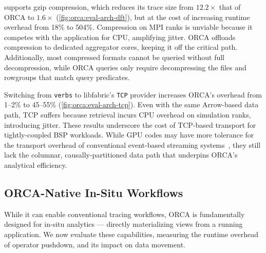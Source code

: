 \dftracer{} supports gzip compression, which reduces its trace size from $12.2\times$ that of ORCA
to $1.6\times$ (\cref{fig:orca:eval-arch-dft}), but at the cost of increasing runtime overhead from
18\% to 504\%.
Compression on MPI ranks is unviable because it competes with the application for CPU, amplifying
jitter.
ORCA offloads compression to dedicated aggregator cores, keeping it off the critical path.
Additionally, most compressed formats cannot be queried without full decompression, while ORCA
queries only require decompressing the files and rowgroups that match query predicates.

Switching from \texttt{verbs} to libfabric's \texttt{TCP} provider increases ORCA's overhead from
1--2\% to 45--55\% (\cref{fig:orca:eval-arch-tcp}).
Even with the same Arrow-based data path, TCP suffers because retrieval incurs CPU overhead on
simulation ranks, introducing jitter.
These results underscore the cost of TCP-based transport for tightly-coupled BSP workloads.
While GPU codes may have more tolerance for the transport overhead of conventional event-based streaming systems~\cite{Carbo2015:ApacheFlink,Kreps2011:Kafka},
they still lack the columnar, causally-partitioned data path that underpins ORCA's analytical efficiency.


\subsection{ORCA-Native In-Situ Workflows}
\label{sec:orca:eval-insitu}


\tabEvalFlows{}

\figEvalOrcaNative{}

While it can enable conventional tracing workflows, ORCA is fundamentally designed for in-situ
analytics --- directly materializing views from a running application.
We now evaluate these capabilities, measuring the runtime overhead of operator pushdown, and its
impact on data movement.

